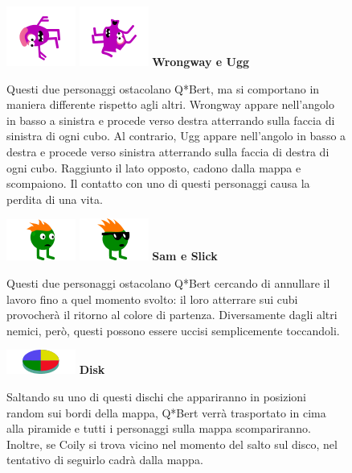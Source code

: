 \documentclass[a4paper,12pt, hidelinks]{report}
\begin{document}
\begin{figure}[H]
		\item
		\includegraphics[width=0.15\linewidth]{img/Wrongway}
		\includegraphics[width=0.15\linewidth]{img/Ugg}
		\label{img:Wrongway&Ugg}
		\textbf{Wrongway e Ugg}

		Questi due personaggi ostacolano Q*Bert, ma si comportano in maniera differente rispetto agli altri. Wrongway appare nell'angolo in basso a sinistra e procede verso destra atterrando sulla faccia di sinistra di ogni cubo. Al contrario, Ugg appare nell'angolo in basso a destra e procede verso sinistra atterrando sulla faccia di destra di ogni cubo. Raggiunto il lato opposto, cadono dalla mappa e scompaiono. Il contatto con uno di questi personaggi causa la perdita di una vita.

\end{figure}

\begin{figure}[H]
		\item
		\includegraphics[width=0.15\linewidth]{img/Sam}
		\includegraphics[width=0.15\linewidth]{img/Slick}
		\label{img:Sam&Slick}
		\textbf{Sam e Slick}

		Questi due personaggi ostacolano Q*Bert cercando di annullare il lavoro fino a quel momento svolto: il loro atterrare sui cubi provocherà il ritorno al colore di partenza. Diversamente dagli altri nemici, però, questi possono essere uccisi semplicemente toccandoli.

\end{figure}

\begin{figure}[H]
		\item
		\includegraphics[width=0.15\linewidth]{img/Disk}
		\label{img:Disk}
		\textbf{Disk}

		Saltando su uno di questi dischi che appariranno in posizioni random sui bordi della mappa, Q*Bert verrà trasportato in cima alla piramide e tutti i personaggi sulla mappa scompariranno. Inoltre, se Coily si trova vicino nel momento del salto sul disco, nel tentativo di seguirlo cadrà dalla mappa.

\end{figure}
\end{document}
